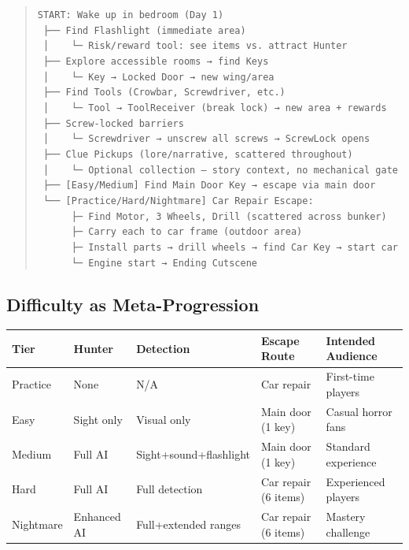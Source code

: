 \documentclass[11pt]{article}
\begin{document}
\begin{quote}
\texttt{START: Wake up in bedroom (Day 1)}\\
\texttt{~├── Find Flashlight (immediate area)}\\
\texttt{~│~~~~└─ Risk/reward tool: see items vs. attract Hunter}\\
\texttt{~├── Explore accessible rooms → find Keys}\\
\texttt{~│~~~~└─ Key → Locked Door → new wing/area}\\
\texttt{~├── Find Tools (Crowbar, Screwdriver, etc.)}\\
\texttt{~│~~~~└─ Tool → ToolReceiver (break lock) → new area + rewards}\\
\texttt{~├── Screw-locked barriers}\\
\texttt{~│~~~~└─ Screwdriver → unscrew all screws → ScrewLock opens}\\
\texttt{~├── Clue Pickups (lore/narrative, scattered throughout)}\\
\texttt{~│~~~~└─ Optional collection --- story context, no mechanical gate}\\
\texttt{~├── [Easy/Medium] Find Main Door Key → escape via main door}\\
\texttt{~└── [Practice/Hard/Nightmare] Car Repair Escape:}\\
\texttt{~~~~~~├─ Find Motor, 3 Wheels, Drill (scattered across bunker)}\\
\texttt{~~~~~~├─ Carry each to car frame (outdoor area)}\\
\texttt{~~~~~~├─ Install parts → drill wheels → find Car Key → start car}\\
\texttt{~~~~~~└─ Engine start → Ending Cutscene}
\end{quote}

\subsection{Difficulty as Meta-Progression}

\begin{table}[h]
\centering
\small
\begin{tabular}{@{}lllll@{}}
\toprule
\textbf{Tier} & \textbf{Hunter} & \textbf{Detection} & \textbf{Escape Route} & \textbf{Intended Audience} \\
\midrule
Practice & None & N/A & Car repair & First-time players \\
Easy & Sight only & Visual only & Main door (1 key) & Casual horror fans \\
Medium & Full AI & Sight+sound+flashlight & Main door (1 key) & Standard experience \\
Hard & Full AI & Full detection & Car repair (6 items) & Experienced players \\
Nightmare & Enhanced AI & Full+extended ranges & Car repair (6 items) & Mastery challenge \\
\bottomrule
\end{tabular}
\end{table}
\end{document}
